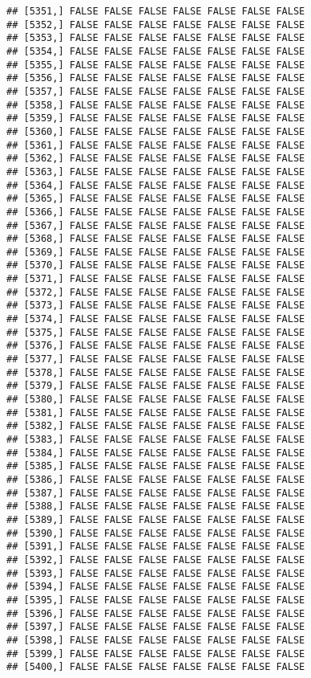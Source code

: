 \documentclass[
]{article}
\begin{document}
\begin{verbatim}
## [5351,] FALSE FALSE FALSE FALSE FALSE FALSE FALSE
## [5352,] FALSE FALSE FALSE FALSE FALSE FALSE FALSE
## [5353,] FALSE FALSE FALSE FALSE FALSE FALSE FALSE
## [5354,] FALSE FALSE FALSE FALSE FALSE FALSE FALSE
## [5355,] FALSE FALSE FALSE FALSE FALSE FALSE FALSE
## [5356,] FALSE FALSE FALSE FALSE FALSE FALSE FALSE
## [5357,] FALSE FALSE FALSE FALSE FALSE FALSE FALSE
## [5358,] FALSE FALSE FALSE FALSE FALSE FALSE FALSE
## [5359,] FALSE FALSE FALSE FALSE FALSE FALSE FALSE
## [5360,] FALSE FALSE FALSE FALSE FALSE FALSE FALSE
## [5361,] FALSE FALSE FALSE FALSE FALSE FALSE FALSE
## [5362,] FALSE FALSE FALSE FALSE FALSE FALSE FALSE
## [5363,] FALSE FALSE FALSE FALSE FALSE FALSE FALSE
## [5364,] FALSE FALSE FALSE FALSE FALSE FALSE FALSE
## [5365,] FALSE FALSE FALSE FALSE FALSE FALSE FALSE
## [5366,] FALSE FALSE FALSE FALSE FALSE FALSE FALSE
## [5367,] FALSE FALSE FALSE FALSE FALSE FALSE FALSE
## [5368,] FALSE FALSE FALSE FALSE FALSE FALSE FALSE
## [5369,] FALSE FALSE FALSE FALSE FALSE FALSE FALSE
## [5370,] FALSE FALSE FALSE FALSE FALSE FALSE FALSE
## [5371,] FALSE FALSE FALSE FALSE FALSE FALSE FALSE
## [5372,] FALSE FALSE FALSE FALSE FALSE FALSE FALSE
## [5373,] FALSE FALSE FALSE FALSE FALSE FALSE FALSE
## [5374,] FALSE FALSE FALSE FALSE FALSE FALSE FALSE
## [5375,] FALSE FALSE FALSE FALSE FALSE FALSE FALSE
## [5376,] FALSE FALSE FALSE FALSE FALSE FALSE FALSE
## [5377,] FALSE FALSE FALSE FALSE FALSE FALSE FALSE
## [5378,] FALSE FALSE FALSE FALSE FALSE FALSE FALSE
## [5379,] FALSE FALSE FALSE FALSE FALSE FALSE FALSE
## [5380,] FALSE FALSE FALSE FALSE FALSE FALSE FALSE
## [5381,] FALSE FALSE FALSE FALSE FALSE FALSE FALSE
## [5382,] FALSE FALSE FALSE FALSE FALSE FALSE FALSE
## [5383,] FALSE FALSE FALSE FALSE FALSE FALSE FALSE
## [5384,] FALSE FALSE FALSE FALSE FALSE FALSE FALSE
## [5385,] FALSE FALSE FALSE FALSE FALSE FALSE FALSE
## [5386,] FALSE FALSE FALSE FALSE FALSE FALSE FALSE
## [5387,] FALSE FALSE FALSE FALSE FALSE FALSE FALSE
## [5388,] FALSE FALSE FALSE FALSE FALSE FALSE FALSE
## [5389,] FALSE FALSE FALSE FALSE FALSE FALSE FALSE
## [5390,] FALSE FALSE FALSE FALSE FALSE FALSE FALSE
## [5391,] FALSE FALSE FALSE FALSE FALSE FALSE FALSE
## [5392,] FALSE FALSE FALSE FALSE FALSE FALSE FALSE
## [5393,] FALSE FALSE FALSE FALSE FALSE FALSE FALSE
## [5394,] FALSE FALSE FALSE FALSE FALSE FALSE FALSE
## [5395,] FALSE FALSE FALSE FALSE FALSE FALSE FALSE
## [5396,] FALSE FALSE FALSE FALSE FALSE FALSE FALSE
## [5397,] FALSE FALSE FALSE FALSE FALSE FALSE FALSE
## [5398,] FALSE FALSE FALSE FALSE FALSE FALSE FALSE
## [5399,] FALSE FALSE FALSE FALSE FALSE FALSE FALSE
## [5400,] FALSE FALSE FALSE FALSE FALSE FALSE FALSE

\end{verbatim}
\end{document}
